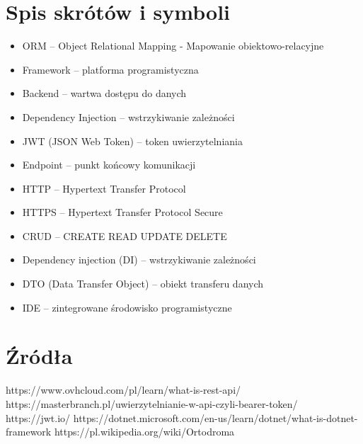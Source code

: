 \documentclass[a4paper,twoside,12pt]{book}
\begin{document}
\begin{appendices}

\chapter{Spis skrótów i symboli}

\begin{itemize}
    \item ORM -- Object Relational Mapping - Mapowanie obiektowo-relacyjne
    \item Framework -- platforma programistyczna
    \item Backend -- wartwa dostępu do danych
    \item Dependency Injection -- wstrzykiwanie zależności
    \item JWT (JSON Web Token) -- token uwierzytelniania
    \item Endpoint -- punkt końcowy komunikacji
    \item HTTP -- Hypertext Transfer Protocol
    \item HTTPS -- Hypertext Transfer Protocol Secure
    \item CRUD -- CREATE READ UPDATE DELETE
    \item Dependency injection (DI) -- wstrzykiwanie zależności
    \item DTO (Data Transfer Object) -- obiekt transferu danych
    \item IDE -- zintegrowane środowisko programistyczne
\end{itemize}



\chapter{Źródła}
https://www.ovhcloud.com/pl/learn/what-is-rest-api/ 
https://masterbranch.pl/uwierzytelnianie-w-api-czyli-bearer-token/ 
https://jwt.io/ 
https://dotnet.microsoft.com/en-us/learn/dotnet/what-is-dotnet-framework
https://pl.wikipedia.org/wiki/Ortodroma 








\end{appendices}
\end{document}
